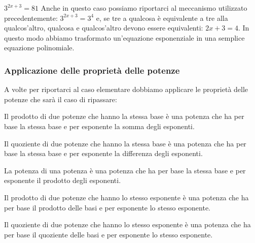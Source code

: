 \begin{esempio}
\(3^{2x+3}=81\) Anche in questo caso possiamo riportarci al meccanismo 
utilizzato precedentemente: \(3^{2x+3}=3^4\) e, se tre a qualcosa è equivalente 
a tre alla qualcos'altro, qualcosa e qualcos'altro devono essere equivalenti: 
\({2x+3}=4\). In questo modo abbiamo trasformato un'equazione esponenziale in 
una semplice equazione polinomiale.
\end{esempio}

\subsubsection{Applicazione delle proprietà delle potenze}
\label{subsubsec:esplog_eq_proprpot}

A volte per riportarci al caso elementare dobbiamo applicare le proprietà delle 
potenze che sarà il caso di ripassare:

\begin{description} [nosep]%
 \item [\(a^m \cdot a^n = a^{m+n}\)]
 Il prodotto di due  potenze che hanno la stessa base è una potenza che ha per 
base la stessa base e per esponente la somma degli esponenti.
 \item [\(a^m \div a^n = a^{m-n}\)]
 Il quoziente di due  potenze che hanno la stessa base è una potenza che ha per 
base la stessa base e per esponente la differenza degli esponenti.
 \item [\(\tonda{a^m}^n = a^{m \cdot n}\)]
 La potenza di una potenza è una potenza che ha per base la stessa base e per 
esponente il prodotto degli esponenti.
 \item [\(a^n \cdot b^n = \tonda{a \cdot b}^n\)]
 Il prodotto di due  potenze che hanno lo stesso esponente è una potenza che ha 
per base il prodotto delle basi e per esponente lo stesso esponente.
 \item [\(a^n \div b^n = \tonda{a \div b}^n\)]
 Il quoziente di due  potenze che hanno lo stesso esponente è una potenza che 
ha per base il quoziente delle basi e per esponente lo stesso esponente.
\end{description}


